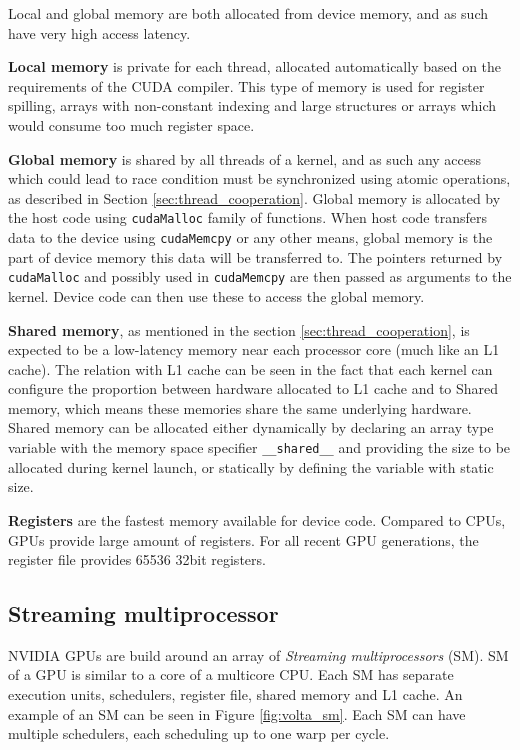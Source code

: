 Local and global memory are both allocated from device memory, and as such have very high access latency. 

\textbf{Local memory} is private for each thread, allocated automatically based on the requirements of the CUDA compiler. This type of memory is used for register spilling, arrays with non-constant indexing and large structures or arrays which would consume too much register space. 

\textbf{Global memory} is shared by all threads of a kernel, and as such any access which could lead to race condition must be synchronized using atomic operations, as described in Section \ref{sec:thread_cooperation}. Global memory is allocated by the host code using \texttt{cudaMalloc} family of functions. When host code transfers data to the device using \texttt{cudaMemcpy} or any other means, global memory is the part of device memory this data will be transferred to. The pointers returned by \texttt{cudaMalloc} and possibly used in \texttt{cudaMemcpy} are then passed as arguments to the kernel. Device code can then use these to access the global memory. 

\textbf{Shared memory}, as mentioned in the section \ref{sec:thread_cooperation}, is expected to be a low-latency memory near each processor core (much like an L1 cache). The relation with L1 cache can be seen in the fact that each kernel can configure the proportion between hardware allocated to L1 cache and to Shared memory, which means these memories share the same underlying hardware. Shared memory can be allocated either dynamically by declaring an array type variable with the memory space specifier \texttt{\_\_shared\_\_} and providing the size to be allocated during kernel launch, or statically by defining the variable with static size.


\textbf{Registers} are the fastest memory available for device code. Compared to CPUs, GPUs provide large amount of registers. For all recent GPU generations, the register file provides 65536 32bit registers. 

\subsection{Streaming multiprocessor}
\label{sec:sm}
NVIDIA GPUs are build around an array of \textit{Streaming multiprocessors} (SM). SM of a GPU is similar to a core of a multicore CPU. Each SM has separate execution units, schedulers, register file, shared memory and L1 cache. An example of an SM can be seen in Figure \ref{fig:volta_sm}. Each SM can have multiple schedulers, each scheduling up to one warp per cycle. 

